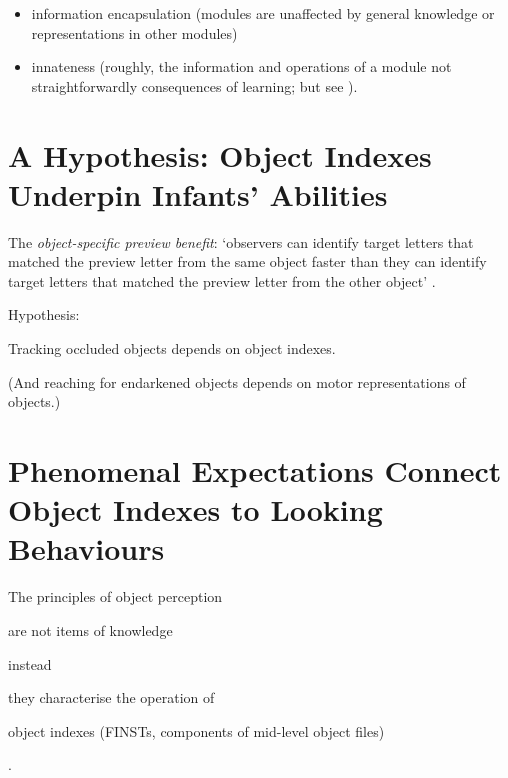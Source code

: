 \documentclass[12pt]{extarticle}
\begin{document}
\begin{multicols}{3}
\begin{itemize}
\item information encapsulation (modules are unaffected by general knowledge or representations in other modules)

\item innateness (roughly, the information and operations of a module not straightforwardly consequences of learning; but see \citet{Samuels:2004ho}).

\end{itemize}



\section{A Hypothesis: Object Indexes Underpin Infants’ Abilities}

The \emph{object-specific preview benefit}: ‘observers can identify target
letters that matched the preview letter from the same object faster than
they can identify target letters that matched the preview letter from the
other object’ \citep[p.\ 2]{Krushke:1996ge}.

Hypothesis:



Tracking occluded objects depends on object indexes.



(And reaching for endarkened objects depends on motor representations of objects.)




\section{Phenomenal Expectations Connect Object Indexes to Looking Behaviours}

The principles of object perception



are not items of knowledge



instead



they characterise the operation of



object indexes (FINSTs, components of mid-level object files)

\citep{Leslie:1998zk,Scholl:1999mi,Carey:2001ue,scholl:2007_objecta}.


    




\footnotesize


\end{multicols}
\end{document}
